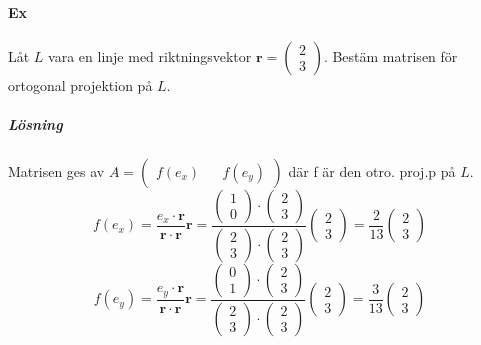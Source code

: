 \paragraph{Ex} Låt $L$ vara en linje med riktningsvektor $\bm{r}=\begin{pmatrix}2\\3\end{pmatrix}$.
Bestäm matrisen för ortogonal projektion på $L$.
\subparagraph{Lösning} Matrisen ges av $A=\begin{pmatrix}f(e_{x})&&f(e_{y})\end{pmatrix}$ där f är den otro. proj.p på $L$.
\begin{equation*}
    f(e_{x})=\frac{e_{x}\cdot \bm{r}}{\bm{r}\cdot \bm{r}}\bm{r}=\frac{\begin{pmatrix}1\\0\end{pmatrix}\cdot \begin{pmatrix}2\\3\end{pmatrix}}{\begin{pmatrix}2\\3\end{pmatrix}\cdot\begin{pmatrix}2\\3\end{pmatrix}}\begin{pmatrix}2\\3\end{pmatrix}=\frac{2}{13}\begin{pmatrix}2\\3\end{pmatrix}
\end{equation*}
\begin{equation*}
    f(e_{y})=\frac{e_{y}\cdot \bm{r}}{\bm{r} \cdot \bm{r}}\bm{r}=\frac{\begin{pmatrix}0\\1\end{pmatrix}\cdot \begin{pmatrix}2\\3\end{pmatrix}}{\begin{pmatrix}2\\3\end{pmatrix}\cdot\begin{pmatrix}2\\3\end{pmatrix}}\begin{pmatrix}2\\3\end{pmatrix}=\frac{3}{13}\begin{pmatrix}2\\3\end{pmatrix}
\end{equation*}


